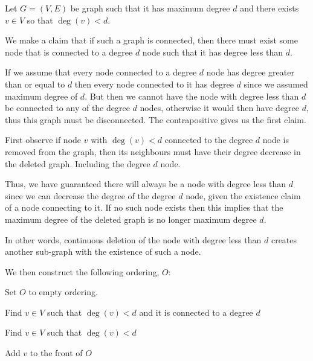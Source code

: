 \begin{soln}
	Let \(G = (V, E)\) be graph such that it has maximum degree \(d\) and there exists \(v \in V\) so that \(\deg(v) < d\).

	We make a claim that if such a graph is connected, then there must exist some node that is connected to a degree \(d\) node such that it has degree less than \(d\).

	If we assume that every node connected to a degree \(d\) node has degree greater than or equal to \(d\) then every node connected to it has degree \(d\) since we assumed maximum degree of \(d\).
	But then we cannot have the node with degree less than \(d\) be connected to any of the degree \(d\) nodes, otherwise it would then have degree \(d\), thus this graph must be disconnected.
	The contrapositive gives us the first claim.

	First observe if node \(v\) with \(\deg(v) < d\) connected to the degree \(d\) node is removed from the graph, then its neighbours must have their degree decrease in the deleted graph.
	Including the degree \(d\) node.

	Thus, we have guaranteed there will always be a node with degree less than \(d\) since we can decrease the degree of the degree \(d\) node,
	given the existence claim of a node connecting to it. If no such node exists then this implies that the maximum degree of the deleted graph is no longer maximum degree \(d\).

	In other words, continuous deletion of the node with degree less than \(d\) creates another sub-graph with the existence of such a node.

	We then construct the following ordering, \(O\):

	\begin{algorithmic}[1]

		\State Set \(O\) to empty ordering.



		\State Find $v \in V$ such that $\deg(v) < d$ and it is connected to a degree \(d\)


		\State Find $v \in V$ such that $\deg(v) < d$

		\EndIf

		\State Add $v$ to the front of $O$


\end{algorithmic}
\end{soln}
